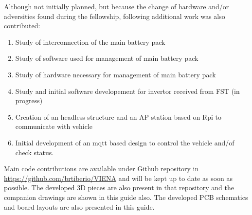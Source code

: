 Although not initially planned, but because the change of hardware and/or adversities found during the fellowship, following additional work was also contributed:
\begin{enumerate}
	\item Study of interconnection of the main battery pack
	\item Study of software used for management of main battery pack
	\item Study of hardware necessary for management of main battery pack
	\item Study and initial software developement  for invertor received from \acrshort{FST} (in progress)
	\item Creation of an headless structure and an AP station based on \gls{Rpi} to communicate with vehicle
	\item Initial development of an mqtt based design to control the vehicle and/of check status. 
\end{enumerate}

Main code contributions are available under Github repository in \url{https://github.com/brtiberio/VIENA} and will be kept up to date as soon as possible.
The developed 3D pieces are also present in that repository and the companion drawings are shown in this guide also.
The developed PCB schematics and board layouts are also presented in this guide.





